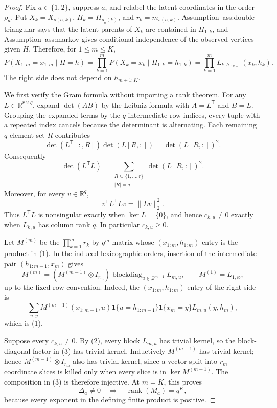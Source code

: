\documentclass{article}
\begin{document}
\begin{proof}
Fix \(a\in\{1,2\}\), suppress \(a\), and relabel the latent coordinates in the order \(\rho_a\).  Put \(X_k=X_{s(a,k)}\), \(H_k=H_{\rho_a(k)}\), and \(r_k=m_{s(a,k)}\).  Assumption~\textnormal{ass:double-triangular} says that the latent parents of \(X_k\) are contained in \(H_{1:k}\), and Assumption~\textnormal{ass:markov} gives conditional independence of the observed vertices given \(H\).  Therefore, for \(1\le m\le K\),
\[
 P(X_{1:m}=x_{1:m}\mid H=h)
 =\prod_{k=1}^m
 P(X_k=x_k\mid H_{1:k}=h_{1:k})
 =\prod_{k=1}^mL_{k,h_{1:k-1}}(x_k,h_k).
\tag{1}
\]
The right side does not depend on \(h_{m+1:K}\).

We first verify the Gram formula without importing a rank theorem.  For any \(L\in\mathbb R^{r\times q}\), expand \(\det(AB)\) by the Leibniz formula with \(A=L^{\mathsf T}\) and \(B=L\).  Grouping the expanded terms by the \(q\) intermediate row indices, every tuple with a repeated index cancels because the determinant is alternating.  Each remaining \(q\)-element set \(R\) contributes
\[
 \det(L^{\mathsf T}[:,R])\det(L[R,:])
 =\det(L[R,:])^2.
\]
Consequently
\[
 \det(L^{\mathsf T}L)=
 \sum_{\substack{R\subseteq\{1,\ldots,r\}\\|R|=q}}
 \det(L[R,:])^2.
\tag{2}
\]
Moreover, for every \(v\in\mathbb R^q\),
\[
 v^{\mathsf T}L^{\mathsf T}Lv=\|Lv\|_2^2.
\]
Thus \(L^{\mathsf T}L\) is nonsingular exactly when \(\ker L=\{0\}\), and hence \(c_{k,u}\neq0\) exactly when \(L_{k,u}\) has column rank \(q\).  In particular \(c_{k,u}\ge0\).

Let \(M^{(m)}\) be the \(\prod_{k=1}^mr_k\)-by-\(q^m\) matrix whose \((x_{1:m},h_{1:m})\) entry is the product in (1).  In the induced lexicographic orders, insertion of the intermediate pair \((h_{1:m-1},x_m)\) gives
\[
 M^{(m)}=(M^{(m-1)}\otimes I_{r_m})
 \operatorname{blockdiag}_{u\in\mathcal Q^{m-1}}L_{m,u},
 \qquad M^{(1)}=L_{1,\varnothing},
\tag{3}
\]
up to the fixed row convention.  Indeed, the \((x_{1:m},h_{1:m})\) entry of the right side is
\[
 \sum_{u,y}M^{(m-1)}(x_{1:m-1},u)
 \mathbf1\{u=h_{1:m-1}\}\mathbf1\{x_m=y\}
 L_{m,u}(y,h_m),
\]
which is (1).

Suppose every \(c_{k,u}\neq0\).  By (2), every block \(L_{m,u}\) has trivial kernel, so the block-diagonal factor in (3) has trivial kernel.  Inductively \(M^{(m-1)}\) has trivial kernel; hence \(M^{(m-1)}\otimes I_{r_m}\) also has trivial kernel, since a vector split into \(r_m\) coordinate slices is killed only when every slice is in \(\ker M^{(m-1)}\).  The composition in (3) is therefore injective.  At \(m=K\), this proves
\[
 \Delta_a\neq0
 \quad\Longrightarrow\quad
 \operatorname{rank}(M_a)=q^K,
\]
because every exponent in the defining finite product is positive.


\end{proof}
\end{document}
